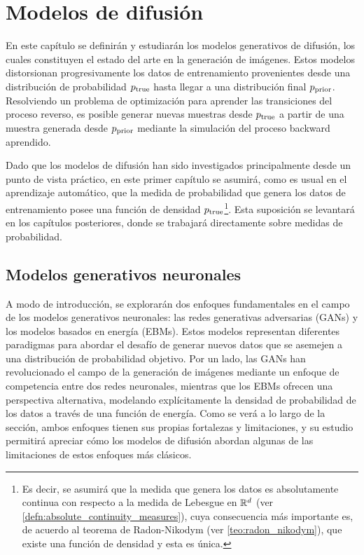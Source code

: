 \chapter{Modelos de difusión}
\label{dm}

En este capítulo se definirán y estudiarán los modelos generativos de difusión, los cuales constituyen el estado del arte en la generación de imágenes. Estos modelos distorsionan progresivamente los datos de entrenamiento provenientes desde una distribución de probabilidad $p_{\operatorname{true}}$ hasta llegar a una distribución final $p_{\operatorname{prior}}$. Resolviendo un problema de optimización para aprender las transiciones del proceso reverso, es posible generar nuevas muestras desde $p_{\operatorname{true}}$ a partir de una muestra generada desde $p_{\operatorname{prior}}$ mediante la simulación del proceso backward aprendido.

Dado que los modelos de difusión han sido investigados principalmente desde un punto de vista práctico, en este primer capítulo se asumirá, como es usual en el aprendizaje automático, que la medida de probabilidad que genera los datos de entrenamiento posee una función de densidad $p_{\operatorname{true}}$\footnote{Es decir, se asumirá que la medida que genera los datos es absolutamente continua con respecto a la medida de Lebesgue en $\mathbb{R}^d$ (ver \autoref{defn:absolute_continuity_measures}), cuya consecuencia más importante es, de acuerdo al teorema de Radon-Nikodym (ver \autoref{teo:radon_nikodym}), que existe una función de densidad y esta es única.}. Esta suposición se levantará en los capítulos posteriores, donde se trabajará directamente sobre medidas de probabilidad.

\section{Modelos generativos neuronales}
\label{dm/generative_models}

A modo de introducción, se explorarán dos enfoques fundamentales en el campo de los modelos generativos neuronales: las redes generativas adversarias (GANs) y los modelos basados en energía (EBMs). Estos modelos representan diferentes paradigmas para abordar el desafío de generar nuevos datos que se asemejen a una distribución de probabilidad objetivo. Por un lado, las GANs han revolucionado el campo de la generación de imágenes mediante un enfoque de competencia entre dos redes neuronales, mientras que los EBMs ofrecen una perspectiva alternativa, modelando explícitamente la densidad de probabilidad de los datos a través de una función de energía. Como se verá a lo largo de la sección, ambos enfoques tienen sus propias fortalezas y limitaciones, y su estudio permitirá apreciar cómo los modelos de difusión abordan algunas de las limitaciones de estos enfoques más clásicos.

